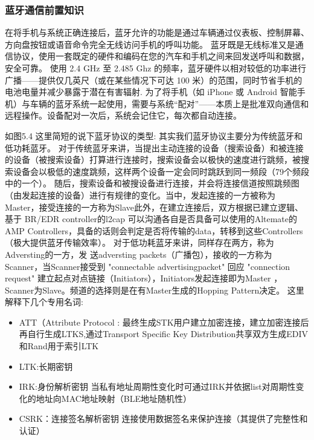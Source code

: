 \subsubsection{蓝牙通信前置知识}
在将手机与系统正确连接后，蓝牙允许的功能是通过车辆通过仪表板、控制屏幕、方向盘按钮或语音命令完全无线访问手机的呼叫功能。
蓝牙既是无线标准又是通信协议，使用一套既定的硬件和编码在您的汽车和手机之间来回发送呼叫和数据，安全可靠。
使用 2.4 GHz 至 2.485 Ghz 的频率，蓝牙硬件以相对较低的功率进行广播——提供仅几英尺（或在某些情况下可达 100 米）的范围，同时节省手机的电池电量并减少暴露于潜在有害辐射.
为了将手机（如 iPhone 或 Android 智能手机）与车辆的蓝牙系统一起使用，需要与系统“配对”——本质上是批准双向通信和远程操作。设备配对一次后，系统会记住它，每次都自动连接。

如图5.4
这里简短的说下蓝牙协议的类型: 
其实我们蓝牙协议主要分为传统蓝牙和低功耗蓝牙。
对于传统蓝牙来讲，当提出主动连接的设备（搜索设备）和被连接的设备（被搜索设备）打算进行连接时，搜索设备会以极快的速度进行跳频，被搜索设备会以极低的速度跳频，这样两个设备一定会同时跳跃到同一频段（79个频段中的一个）。
随后，搜索设备和被搜设备进行连接，并会将连接信道按照跳频图（由发起连接的设备）进行有规律的变化。当中，发起连接的一方被称为Master，接受连接的一方称为Slave此外，在建立连接后，双方根据已建立逻辑、基于 BR/EDR controller的l2cap 可以沟通各自是否具备可以使用的Altemate的AMP Controllers，具备的话则会判定是否将传输的data，转移到这些Controllers（极大提供蓝牙传输效率）。
对于低功耗蓝牙来讲，同样存在两方，称为Adversting的一方，发 送adversting packets（广播包），接收的一方称为Scanner，当Scanner接受到 "connectable advertisingpacket" 回应 "connection request"  建立起点对点链接（Initiators），Initiators发起连接即为Master ，Scanner为Slave。频道的选择则是在有Master生成的Hopping Pattern决定。
这里解释下几个专用名词:
\begin{itemize}
    \item ATT（Attribute Protocol : 最终生成STK用户建立加密连接，建立加密连接后再自行生成LTKS,通过Transport Specific Key Distribution共享双方生成EDIV和Rand用于索引LTK
    \item LTK:长期密钥
    \item IRK:身份解析密钥   当私有地址周期性变化时可通过IRK并依据list对周期性变化的地址向MAC地址映射（BLE地址随机性）
    \item CSRK：连接签名解析密钥  连接使用数据签名来保护连接（其提供了完整性和认证）
\end{itemize}


